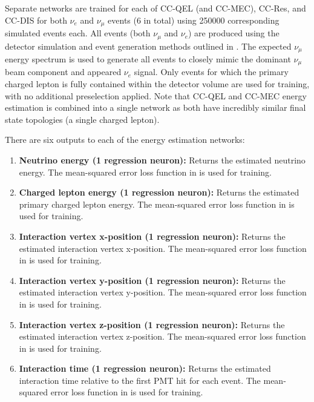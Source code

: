Separate networks are trained for each of CC-QEL (and CC-MEC), CC-Res, and CC-DIS for both
$\nu_{e}$ and $\nu_{\mu}$ events (6 in total) using 250000 corresponding simulated events each.
All events (both $\nu_{\mu}$ and $\nu_{e}$) are produced using the detector simulation and event
generation methods outlined in . The expected \chipsfive
$\nu_{\mu}$ energy spectrum is used to generate all events to closely mimic the dominant
$\nu_{\mu}$ beam component and appeared $\nu_{e}$ signal. Only events for which the primary
charged lepton is fully contained within the detector volume are used for training, with no
additional preselection applied. Note that CC-QEL and CC-MEC energy estimation is combined into a
single network as both have incredibly similar final state topologies (a single charged lepton).

There are six outputs to each of the energy estimation networks:
\begin{enumerate}
    \item \textbf{Neutrino energy (1 regression neuron):} Returns the estimated neutrino energy.
          The mean-squared error loss function in  is used for training.
    \item \textbf{Charged lepton energy (1 regression neuron):} Returns the estimated primary
          charged lepton energy. The mean-squared error loss function in  is
          used for training.
    \item \textbf{Interaction vertex x-position (1 regression neuron):} Returns the estimated
          interaction vertex x-position. The mean-squared error loss function in
           is used for training.
    \item \textbf{Interaction vertex y-position (1 regression neuron):} Returns the estimated
          interaction vertex y-position. The mean-squared error loss function in
           is used for training.
    \item \textbf{Interaction vertex z-position (1 regression neuron):} Returns the estimated
          interaction vertex z-position. The mean-squared error loss function in
           is used for training.
    \item \textbf{Interaction time (1 regression neuron):} Returns the estimated interaction time
          relative to the first PMT hit for each event. The mean-squared error loss function in
           is used for training.
\end{enumerate}

